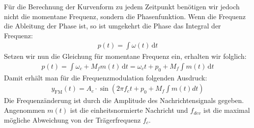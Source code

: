 \documentclass[letterpaper,10pt,english]{jupyterBook}
\begin{document}
\sphinxAtStartPar
Für die Berechnung der Kurvenform zu jedem Zeitpunkt benötigen wir jedoch nicht die momentane Frequenz, sondern die Phasenfunktion. Wenn die Frequenz die Ableitung der Phase ist, so ist umgekehrt die Phase das Integral der Frequenz:
\begin{equation*}
\begin{split} p(t)=\int \omega (t)\,\mathrm {d} t \end{split}
\end{equation*}
\sphinxAtStartPar
Setzen wir nun die Gleichung für momentane Frequenz ein, erhalten wir folglich:
\begin{equation*}
\begin{split} p(t)=\int \omega_c+M_{f} m(t)\,\mathrm {d} t = \omega_c t + p_0 + M_{f} \int  m(t)\,\mathrm {d} t\end{split}
\end{equation*}
\sphinxAtStartPar
Damit erhält man für die Frequenzmodulation folgenden Ausdruck:
\begin{equation*}
\begin{split}y_\mathrm{FM}(t) = A_c \cdot \sin\left(2\pi f_c t + p_0 + M_f\int m(t) dt \right)\end{split}
\end{equation*}
\sphinxAtStartPar
Die Frequenzänderung ist durch die Amplitude des Nachrichtensignals gegeben. Angenommen \(m(t)\) ist die einheitsnormierte Nachricht und \(f_{dev}\) ist die maximal mögliche Abweichung von der Trägerfrequenz \(f_c\).
\end{document}
